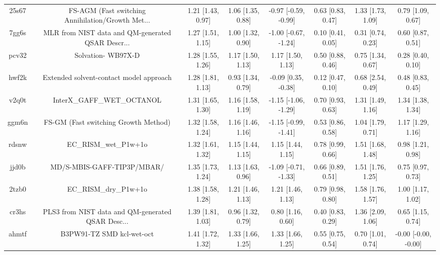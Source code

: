 \documentclass{article}
\begin{document}
\begin{center}
\begin{longtable}{|cccccccc|}
 25s67 &  FS-AGM (Fast switching Annihilation/Growth Met... &  1.21 [1.43, 0.97] &  1.06 [1.35, 0.88] &  -0.97 [-0.59, -0.99] &  0.63 [0.83, 0.47] &     1.33 [1.73, 1.09] &     0.79 [1.09, 0.67] \\
 7gg6s &  MLR from NIST data and QM-generated QSAR Descr... &  1.27 [1.51, 1.15] &  1.00 [1.32, 0.90] &  -1.00 [-0.67, -1.24] &  0.10 [0.41, 0.05] &     0.31 [0.74, 0.23] &     0.60 [0.87, 0.51] \\
 pcv32 &                                 Solvation- WB97X-D &  1.28 [1.55, 1.26] &  1.17 [1.50, 1.13] &     1.17 [1.50, 1.13] &  0.50 [0.88, 0.46] &     0.75 [1.34, 0.67] &     0.28 [0.40, 0.10] \\
 hwf2k &            Extended solvent-contact model approach &  1.28 [1.81, 1.13] &  0.93 [1.34, 0.79] &   -0.09 [0.35, -0.38] &  0.12 [0.47, 0.10] &     0.68 [2.54, 0.49] &     0.48 [0.83, 0.45] \\
 v2q0t &                         InterX\_GAFF\_WET\_OCTANOL &  1.31 [1.65, 1.30] &  1.16 [1.58, 1.19] &  -1.15 [-1.06, -1.29] &  0.70 [0.93, 0.63] &     1.31 [1.49, 1.16] &     1.34 [1.38, 1.34] \\
 ggm6n &               FS-GM (Fast switching Growth Method) &  1.32 [1.58, 1.24] &  1.16 [1.46, 1.16] &  -1.15 [-0.99, -1.41] &  0.53 [0.86, 0.58] &     1.04 [1.79, 0.71] &     1.17 [1.29, 1.16] \\
 rdsnw &                              EC\_RISM\_wet\_P1w+1o &  1.32 [1.61, 1.32] &  1.15 [1.44, 1.15] &     1.15 [1.44, 1.15] &  0.78 [0.99, 0.66] &     1.51 [1.68, 1.48] &     0.98 [1.21, 0.98] \\
 jjd0b &                         MD/S-MBIS-GAFF-TIP3P/MBAR/ &  1.35 [1.73, 1.24] &  1.13 [1.63, 0.96] &  -1.09 [-0.71, -1.33] &  0.66 [0.89, 0.51] &     1.51 [1.76, 1.25] &     0.75 [0.97, 0.73] \\
 2tzb0 &                              EC\_RISM\_dry\_P1w+1o &  1.38 [1.58, 1.28] &  1.21 [1.46, 1.13] &     1.21 [1.46, 1.13] &  0.79 [0.98, 0.80] &     1.58 [1.76, 1.57] &     1.00 [1.17, 1.02] \\
 cr3hs &  PLS3 from NIST data and QM-generated QSAR Desc... &  1.39 [1.81, 1.03] &  0.96 [1.32, 0.79] &     0.80 [1.16, 0.60] &  0.40 [0.83, 0.29] &     1.36 [2.09, 1.06] &     0.65 [1.15, 0.74] \\
 ahmtf &                          B3PW91-TZ SMD kcl-wet-oct &  1.41 [1.72, 1.32] &  1.33 [1.66, 1.25] &     1.33 [1.66, 1.25] &  0.55 [0.75, 0.54] &     0.70 [1.01, 0.74] &  -0.00 [-0.00, -0.00] \\

\end{longtable}
\end{center}
\end{document}
